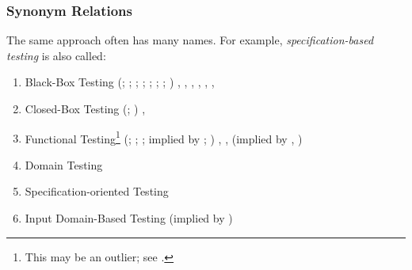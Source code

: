     \begin{landscape}
        \otherCategorizationsTable{}
    \end{landscape}
\fi

\subsubsection{Synonym Relations}
\label{syn-rels}

The same approach often has many names. For example,
\emph{specification-based testing} is also called:
\begin{enumerate}
    \item Black-Box Testing
          \ifnotpaper
              (\citealp[p.~9]{IEEE2022}; \citeyear[p.~8]{IEEE2021};
              \citeyear[p.~431]{IEEE2017}; \citealp[p.~5\=/10]{SWEBOK2024};
              \citealpISTQB{}; \citealp[p.~46 (without hyphen)]{Firesmith2015};
              \citealp[p.~344]{SakamotoEtAl2013}; \citealp[p.~399]{vanVliet2000})
          \else
              \cite[p.~9]{IEEE2022}, \cite{ISTQB}, \cite[p.~431]{IEEE2017},
              \cite[p.~5\=/10]{SWEBOK2024}, \cite[p.~8]{IEEE2021},
              \cite[p.~399]{vanVliet2000},
              \cite[p.~344]{SakamotoEtAl2013}
          \fi
    \item Closed-Box Testing
          \ifnotpaper
              (\citealp[p.~9]{IEEE2022}; \citeyear[p.~431]{IEEE2017})
          \else
              \cite[p.~9]{IEEE2022}, \cite[p.~431]{IEEE2017}
          \fi
    \item Functional Testing\footnote{This may be an outlier; see
              .}
          \ifnotpaper
              (\citealp[p.~196]{IEEE2017}; \citealp[p.~44]{Kam2008};
              \citealp[p.~399]{vanVliet2000}; implied by
              \citealp[p.~129]{IEEE2021}; \citeyear[p.~431]{IEEE2017})
          \else
              \cite[p.~196]{IEEE2017}, \cite[p.~399]{vanVliet2000},
              \cite[p.~44]{Kam2008} (implied by \cite[p.~431]{IEEE2017},
              \cite[p.~129]{IEEE2021})
          \fi
    \item Domain Testing \citep[p.~5\=/10]{SWEBOK2024}
    \item Specification-oriented Testing \citep[p.~440, Fig.~12.2]{PetersAndPedrycz2000}
    \item Input Domain-Based Testing (implied by \citealp[pp.~4\=/7 to
              4\=/8]{SWEBOK2014})
\end{enumerate}

